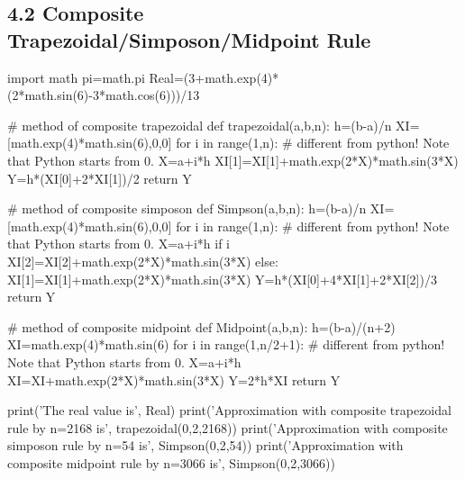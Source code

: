 \documentclass{article}
\begin{document}
    \subsection{4.2 Composite Trapezoidal/Simposon/Midpoint Rule}
    \begin{python}
    import math
    pi=math.pi
    Real=(3+math.exp(4)*(2*math.sin(6)-3*math.cos(6)))/13  

    # method of composite trapezoidal
    def trapezoidal(a,b,n):
        h=(b-a)/n
        XI=[math.exp(4)*math.sin(6),0,0]
        for i in range(1,n): # different from python! Note that Python starts from 0.
            X=a+i*h
            XI[1]=XI[1]+math.exp(2*X)*math.sin(3*X)
        Y=h*(XI[0]+2*XI[1])/2
        return  Y

    # method of composite simposon
    def Simpson(a,b,n):
        h=(b-a)/n
        XI=[math.exp(4)*math.sin(6),0,0]
        for i in range(1,n): # different from python! Note that Python starts from 0.
            X=a+i*h
            if i%
                XI[2]=XI[2]+math.exp(2*X)*math.sin(3*X)
            else:
                XI[1]=XI[1]+math.exp(2*X)*math.sin(3*X)
        Y=h*(XI[0]+4*XI[1]+2*XI[2])/3
        return  Y

    # method of composite midpoint
    def Midpoint(a,b,n):
        h=(b-a)/(n+2)
        XI=math.exp(4)*math.sin(6)
        for i in range(1,n/2+1): # different from python! Note that Python starts from 0.
            X=a+i*h
            XI=XI+math.exp(2*X)*math.sin(3*X)
        Y=2*h*XI
        return  Y


    print('The real value is', Real)
    print('Approximation with composite trapezoidal rule by n=2168 is', trapezoidal(0,2,2168))
    print('Approximation with composite simposon rule by n=54 is', Simpson(0,2,54))
    print('Approximation with composite midpoint rule by n=3066 is', Simpson(0,2,3066))
    \end{python}
\end{document}

